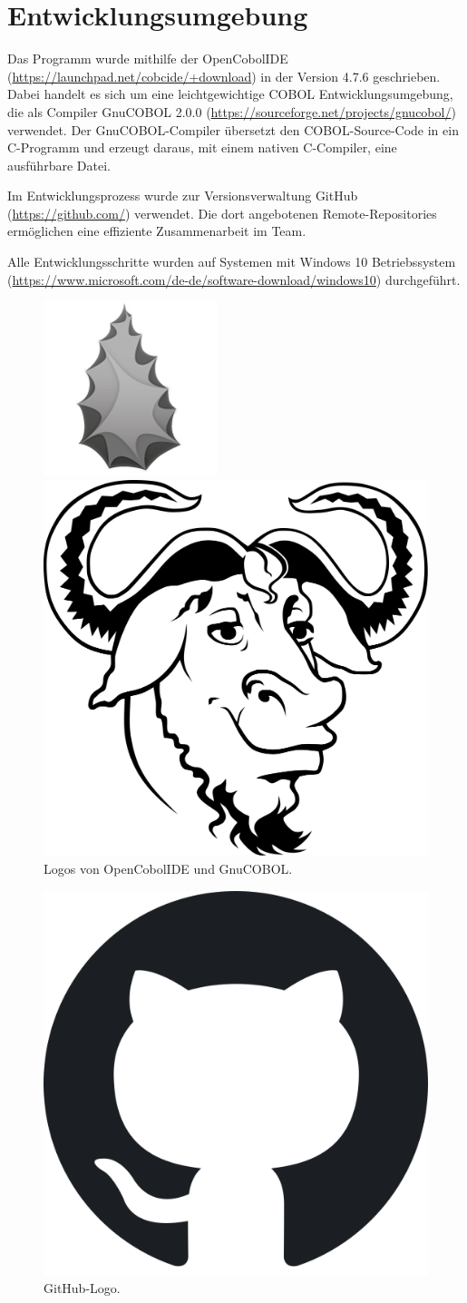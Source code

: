 \chapter{Entwicklungsumgebung}\label{ch:entwicklungsumgebung}

Das Programm wurde mithilfe der OpenCobolIDE (\url{https://launchpad.net/cobcide/+download}) in der Version 4.7.6 geschrieben.
Dabei handelt es sich um eine leichtgewichtige COBOL Entwicklungsumgebung, die als Compiler GnuCOBOL 2.0.0 (\url{https://sourceforge.net/projects/gnucobol/}) verwendet.
Der GnuCOBOL-Compiler übersetzt den COBOL-Source-Code in ein C-Programm und erzeugt daraus, mit einem nativen C-Compiler, eine ausführbare Datei.

Im Entwicklungsprozess wurde zur Versionsverwaltung GitHub (\url{https://github.com/}) verwendet.
Die dort angebotenen Remote-Repositories ermöglichen eine effiziente Zusammenarbeit im Team.

Alle Entwicklungsschritte wurden auf Systemen mit Windows 10 Betriebssystem (\url{https://www.microsoft.com/de-de/software-download/windows10}) durchgeführt.

\begin{figure}[htb]
    \centering
    \begin{minipage}{.5\textwidth}
        \centering
        \includegraphics[width=.4\linewidth]{images/opencobol-logo}
    \end{minipage}%
    \begin{minipage}{.5\textwidth}
        \centering
        \includegraphics[width=.4\linewidth]{images/Gnu-COBOL}
    \end{minipage}
    \caption{Logos von OpenCobolIDE und GnuCOBOL.}
    \label{fig:cobol-logos}
\end{figure}

\begin{figure}[htb]
    \centering
    \includegraphics[width=.15\linewidth]{images/GitHub-Logo}
    \caption{
        GitHub-Logo.
    }
    \label{fig:github}
\end{figure}
